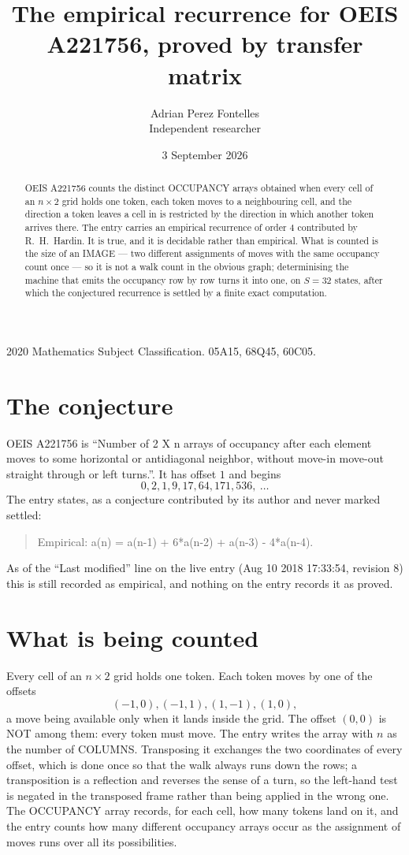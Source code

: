 \documentclass[11pt,a4paper]{article}
\title{The empirical recurrence for OEIS A221756, proved by transfer matrix}
\author{Adrian Perez Fontelles\\ \small Independent researcher}
\date{3 September 2026}
\theoremstyle{plain}
\theoremstyle{definition}
\begin{document}
\maketitle

\begin{abstract}
OEIS A221756 counts the distinct OCCUPANCY arrays obtained when every cell of an $n\times2$ grid
holds one token, each token moves to a neighbouring cell, and the direction a token leaves a
cell in is restricted by the direction in which another token arrives there. The entry carries
an empirical recurrence of order $4$ contributed by R.~H.~Hardin. It is true, and it is
decidable rather than empirical. What is counted is the size of an IMAGE --- two different
assignments of moves with the same occupancy count once --- so it is not a walk count in the
obvious graph; determinising the machine that emits the occupancy row by row turns it into
one, on $S=32$ states, after which the conjectured recurrence is settled by a finite exact
computation.
\end{abstract}

\noindent\small 2020 Mathematics Subject Classification. 05A15, 68Q45, 60C05.\normalsize

\section{The conjecture}

OEIS A221756 is ``Number of 2 X n arrays of occupancy after each element moves to some horizontal or antidiagonal neighbor, without move-in move-out straight through or left turns.''. It has offset $1$ and begins
\[
0, 2, 1, 9, 17, 64, 171, 536,\ \dots
\]
The entry states, as a conjecture contributed by its author and never marked settled:
\begin{quote}
Empirical: a(n) = a(n-1) + 6*a(n-2) + a(n-3) - 4*a(n-4).
\end{quote}
As of the ``Last modified'' line on the live entry (Aug 10 2018 17:33:54, revision 8) this is still
recorded as empirical, and nothing on the entry records it as proved.

\section{What is being counted}

Every cell of an $n\times2$ grid holds one token. Each token moves by one of the offsets
\[
(-1,0), (-1,1), (1,-1), (1,0),
\]
a move being available only when it lands inside the grid. The offset $(0,0)$ is NOT among them: every token must move. The entry writes the array with $n$ as the number of COLUMNS. Transposing it exchanges the two coordinates of every offset, which is done once so that the walk always runs down the rows; a transposition is a reflection and reverses the sense of a turn, so the left-hand test is negated in the transposed frame rather than being applied in the wrong one. The OCCUPANCY array
records, for each cell, how many tokens land on it, and the entry counts how many different
occupancy arrays occur as the assignment of moves runs over all its possibilities.
\end{document}
